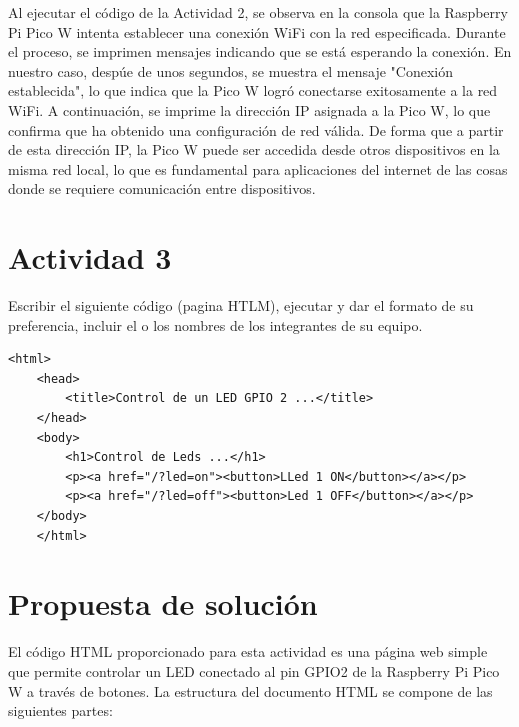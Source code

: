 \documentclass[letterpaper,12pt]{article}
\begin{document}
    Al ejecutar el código de la Actividad 2, se observa en la consola que la Raspberry Pi Pico W intenta establecer una conexión WiFi con la red especificada. Durante el proceso, se imprimen mensajes indicando que se está esperando la conexión. En nuestro caso, despúe de unos segundos, se muestra el mensaje "Conexión establecida", lo que indica que la Pico W logró conectarse exitosamente a la red WiFi. A continuación, se imprime la dirección IP asignada a la Pico W, lo que confirma que ha obtenido una configuración de red válida. De forma que a partir de esta dirección IP, la Pico W puede ser accedida desde otros dispositivos en la misma red local, lo que es fundamental para aplicaciones del internet de las cosas donde se requiere comunicación entre dispositivos. 
    \newpage
    \section*{Actividad 3}

    \noindent Escribir el siguiente código (pagina HTLM), ejecutar y dar el formato de su preferencia,
    incluir el o los nombres de los integrantes de su equipo.

    \begin{lstlisting}[basicstyle=\ttfamily\footnotesize, caption={Figura 12-3. Código HTML de ejemplo; actividad 3}]
    <html>
    <head>
        <title>Control de un LED GPIO 2 ...</title>
    </head>
    <body>
        <h1>Control de Leds ...</h1>
        <p><a href="/?led=on"><button>LLed 1 ON</button></a></p>
        <p><a href="/?led=off"><button>Led 1 OFF</button></a></p>
    </body>
    </html>
    \end{lstlisting}
    \section*{Propuesta de solución}

    El código HTML proporcionado para esta actividad es una página web simple que permite controlar un LED conectado al pin GPIO2 de la Raspberry Pi Pico W a través de botones. La estructura del documento HTML se compone de las siguientes partes:
\end{document}
